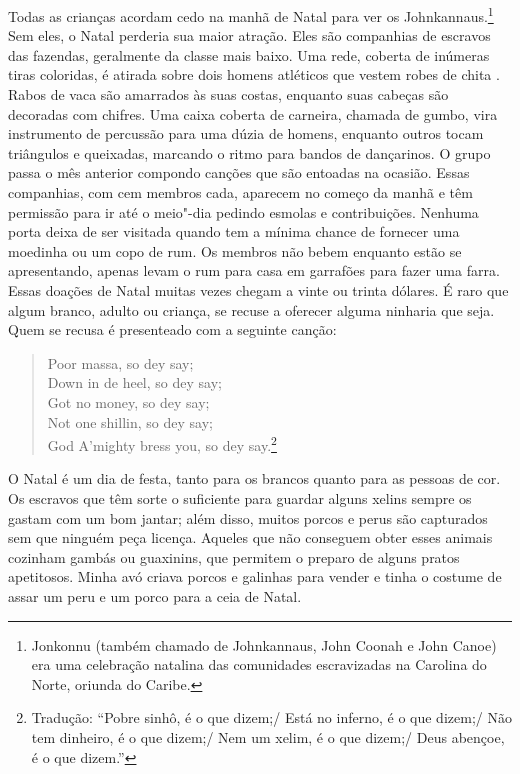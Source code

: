 Todas as crianças acordam cedo na manhã
de Natal para ver os Johnkannaus.\footnote{Jonkonnu (também chamado de
  Johnkannaus, John Coonah e John Canoe) era uma celebração natalina das
  comunidades escravizadas na Carolina do Norte, oriunda do Caribe.} Sem
eles, o Natal perderia sua maior atração. Eles são companhias de
escravos das fazendas, geralmente da classe mais baixo. Uma rede,
coberta de inúmeras tiras coloridas, é atirada sobre dois homens
atléticos que vestem robes de chita . Rabos de vaca são amarrados às
suas costas, enquanto suas cabeças são decoradas com chifres. Uma caixa
coberta de carneira, chamada de gumbo, vira instrumento de percussão
para uma dúzia de homens, enquanto outros tocam triângulos e queixadas,
marcando o ritmo para bandos de dançarinos. O grupo passa o mês anterior
compondo canções que são entoadas na ocasião. Essas companhias, com cem
membros cada, aparecem no começo da manhã e têm permissão para ir até o
meio"-dia pedindo esmolas e contribuições. Nenhuma porta deixa de ser
visitada quando tem a mínima chance de fornecer uma moedinha ou um copo
de rum. Os membros não bebem enquanto estão se apresentando, apenas
levam o rum para casa em garrafões para fazer uma farra. Essas doações
de Natal muitas vezes chegam a vinte ou trinta dólares. É raro que algum
branco, adulto ou criança, se recuse a oferecer alguma ninharia que
seja. Quem se recusa é presenteado com a seguinte canção:

\begin{verse}
Poor massa, so dey say;\\
Down in de heel, so dey say;\\
Got no money, so dey say;\\
Not one shillin, so dey say;\\
God A'mighty bress you, so dey say.\footnote{Tradução: ``Pobre sinhô, é o que dizem;/ Está no inferno, é o que dizem;/ Não tem dinheiro, é o que dizem;/ Nem um xelim, é o que dizem;/ Deus abençoe, é o que dizem.''}
\end{verse}

O Natal é um dia de festa, tanto para
os brancos quanto para as pessoas de cor. Os escravos que têm sorte o
suficiente para guardar alguns xelins sempre os gastam com um bom
jantar; além disso, muitos porcos e perus são capturados sem que ninguém
peça licença. Aqueles que não conseguem obter esses animais cozinham
gambás ou guaxinins, que permitem o preparo de alguns pratos apetitosos.
Minha avó criava porcos e galinhas para vender e tinha o costume de
assar um peru e um porco para a ceia de Natal.

